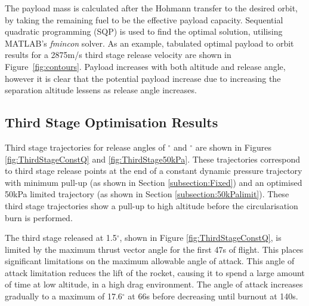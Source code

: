 The payload mass is calculated after the Hohmann transfer to the desired orbit, by taking the remaining fuel to be the effective payload capacity. Sequential quadratic programming (SQP) is used to find the optimal solution, utilising MATLAB's \textit{fmincon} solver.
As an example, tabulated optimal payload to orbit results for a 2875m/s third stage release velocity are shown in Figure~\ref{fig:contours}. Payload increases with both altitude and release angle, however it is clear that the potential payload increase due to increasing the separation altitude lessens as release angle increases.  

\subsection{Third Stage Optimisation Results}

Third stage trajectories for release angles of \SeparationAngleConstq $^\circ$ and \SeparationAngleFiftykPa $^\circ$ are shown in Figures \ref{fig:ThirdStageConstQ} and \ref{fig:ThirdStage50kPa}. 
These trajectories correspond to third stage release points at the end of a constant dynamic pressure trajectory with minimum pull-up (as shown in Section \ref{subsection:Fixed}) and an optimised 50kPa limited trajectory  (as shown in Section \ref{subsection:50kPalimit}). 
These third stage trajectories show a pull-up to high altitude before the circularisation burn is performed. 

The third stage released at 1.5$^\circ$, shown in Figure \ref{fig:ThirdStageConstQ}, is limited by the maximum thrust vector angle for the first 47s of flight. This places significant limitations on the maximum allowable angle of attack. This angle of attack limitation reduces the lift of the rocket, causing it to spend a large amount of time at low altitude, in a high drag environment. The angle of attack increases gradually to a maximum of 17.6$^\circ$ at 66s before decreasing until burnout at 140s. 

